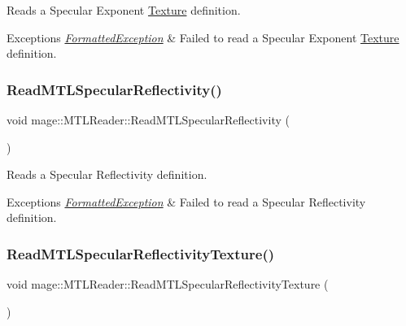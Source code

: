 Reads a Specular Exponent \hyperlink{classmage_1_1_texture}{Texture} definition.


\begin{DoxyExceptions}{Exceptions}
{\em \hyperlink{structmage_1_1_formatted_exception}{Formatted\+Exception}} & Failed to read a Specular Exponent \hyperlink{classmage_1_1_texture}{Texture} definition. \\
\hline
\end{DoxyExceptions}
\hypertarget{classmage_1_1_m_t_l_reader_aa90f43e397bc5fc277b936bdeff4e672}{}\label{classmage_1_1_m_t_l_reader_aa90f43e397bc5fc277b936bdeff4e672} 
\subsubsection{\texorpdfstring{Read\+M\+T\+L\+Specular\+Reflectivity()}{ReadMTLSpecularReflectivity()}}
{\footnotesize\ttfamily void mage\+::\+M\+T\+L\+Reader\+::\+Read\+M\+T\+L\+Specular\+Reflectivity (\begin{DoxyParamCaption}{ }\end{DoxyParamCaption})\hspace{0.3cm}{\ttfamily [private]}}

Reads a Specular Reflectivity definition.


\begin{DoxyExceptions}{Exceptions}
{\em \hyperlink{structmage_1_1_formatted_exception}{Formatted\+Exception}} & Failed to read a Specular Reflectivity definition. \\
\hline
\end{DoxyExceptions}
\hypertarget{classmage_1_1_m_t_l_reader_abb56329a3642b377b006bca6cee60440}{}\label{classmage_1_1_m_t_l_reader_abb56329a3642b377b006bca6cee60440} 
\subsubsection{\texorpdfstring{Read\+M\+T\+L\+Specular\+Reflectivity\+Texture()}{ReadMTLSpecularReflectivityTexture()}}
{\footnotesize\ttfamily void mage\+::\+M\+T\+L\+Reader\+::\+Read\+M\+T\+L\+Specular\+Reflectivity\+Texture (\begin{DoxyParamCaption}{ }\end{DoxyParamCaption})\hspace{0.3cm}{\ttfamily [private]}}

